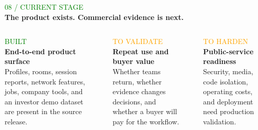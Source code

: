 \documentclass[aspectratio=169,10pt]{beamer}
\newcommand{\kicker}[1]{\textcolor{Green}{\fontsize{7.5}{9}\selectfont\ttfamily\MakeUppercase{#1}}}
\newcommand{\titleline}[2]{%
  {\kicker{#1}}\\[-1pt]
  {\fontsize{23}{26}\selectfont\bfseries #2}\\[3pt]
}
\begin{document}
\begin{frame}
  \titleline{08 / CURRENT STAGE}{The product exists. Commercial evidence is next.}
  \vspace{.25cm}
  \begin{columns}[T,onlytextwidth]
      \textcolor{Green}{\fontsize{8}{10}\selectfont\ttfamily BUILT}\\[.22cm]
      {\fontsize{14}{17}\selectfont\bfseries End-to-end product surface}\\[.15cm]
      {\fontsize{8.5}{11}\selectfont\color{Muted}Profiles, rooms, session reports, network features, jobs, company tools, and an investor demo dataset are present in the source release.}
    \centering\textcolor{Line}{\rule{.5pt}{3.5cm}}
      \textcolor{Orange}{\fontsize{8}{10}\selectfont\ttfamily TO VALIDATE}\\[.22cm]
      {\fontsize{14}{17}\selectfont\bfseries Repeat use and buyer value}\\[.15cm]
      {\fontsize{8.5}{11}\selectfont\color{Muted}Whether teams return, whether evidence changes decisions, and whether a buyer will pay for the workflow.}
    \centering\textcolor{Line}{\rule{.5pt}{3.5cm}}
      \textcolor{Orange}{\fontsize{8}{10}\selectfont\ttfamily TO HARDEN}\\[.22cm]
      {\fontsize{14}{17}\selectfont\bfseries Public-service readiness}\\[.15cm]
      {\fontsize{8.5}{11}\selectfont\color{Muted}Security, media, code isolation, operating costs, and deployment need production validation.}
  \end{columns}
  \vfill
  \colorbox{Soft}{\parbox{\dimexpr\linewidth-2\fboxsep}{\vspace{.16cm}\hspace{.16cm}{\bfseries Investor transparency}\vspace{.16cm}}}
\end{frame}
\end{document}
